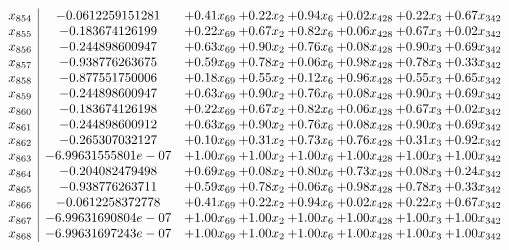 \documentclass[8pt]{article}
\begin{document}
\[\begin{array}{c| c c@{\hskip 2pt} c@{\hskip 2pt} c@{\hskip 2pt} c@{\hskip 2pt} c@{\hskip 2pt} c@{\hskip 2pt} }
 x_{854}   &  -0.0612259151281 & +  0.41 x_{69} & +  0.22 x_{2} & +  0.94 x_{6} & +  0.02 x_{428} & +  0.22 x_{3} & +  0.67 x_{342}\\
 x_{855}   &  -0.183674126199 & +  0.22 x_{69} & +  0.67 x_{2} & +  0.82 x_{6} & +  0.06 x_{428} & +  0.67 x_{3} & +  0.02 x_{342}\\
 x_{856}   &  -0.244898600947 & +  0.63 x_{69} & +  0.90 x_{2} & +  0.76 x_{6} & +  0.08 x_{428} & +  0.90 x_{3} & +  0.69 x_{342}\\
 x_{857}   &  -0.938776263675 & +  0.59 x_{69} & +  0.78 x_{2} & +  0.06 x_{6} & +  0.98 x_{428} & +  0.78 x_{3} & +  0.33 x_{342}\\
 x_{858}   &  -0.877551750006 & +  0.18 x_{69} & +  0.55 x_{2} & +  0.12 x_{6} & +  0.96 x_{428} & +  0.55 x_{3} & +  0.65 x_{342}\\
 x_{859}   &  -0.244898600947 & +  0.63 x_{69} & +  0.90 x_{2} & +  0.76 x_{6} & +  0.08 x_{428} & +  0.90 x_{3} & +  0.69 x_{342}\\
 x_{860}   &  -0.183674126198 & +  0.22 x_{69} & +  0.67 x_{2} & +  0.82 x_{6} & +  0.06 x_{428} & +  0.67 x_{3} & +  0.02 x_{342}\\
 x_{861}   &  -0.244898600912 & +  0.63 x_{69} & +  0.90 x_{2} & +  0.76 x_{6} & +  0.08 x_{428} & +  0.90 x_{3} & +  0.69 x_{342}\\
 x_{862}   &  -0.265307032127 & +  0.10 x_{69} & +  0.31 x_{2} & +  0.73 x_{6} & +  0.76 x_{428} & +  0.31 x_{3} & +  0.92 x_{342}\\
 x_{863}   &  -6.99631555801e-07 & +  1.00 x_{69} & +  1.00 x_{2} & +  1.00 x_{6} & +  1.00 x_{428} & +  1.00 x_{3} & +  1.00 x_{342}\\
 x_{864}   &  -0.204082479498 & +  0.69 x_{69} & +  0.08 x_{2} & +  0.80 x_{6} & +  0.73 x_{428} & +  0.08 x_{3} & +  0.24 x_{342}\\
 x_{865}   &  -0.938776263711 & +  0.59 x_{69} & +  0.78 x_{2} & +  0.06 x_{6} & +  0.98 x_{428} & +  0.78 x_{3} & +  0.33 x_{342}\\
 x_{866}   &  -0.0612258372778 & +  0.41 x_{69} & +  0.22 x_{2} & +  0.94 x_{6} & +  0.02 x_{428} & +  0.22 x_{3} & +  0.67 x_{342}\\
 x_{867}   &  -6.99631690804e-07 & +  1.00 x_{69} & +  1.00 x_{2} & +  1.00 x_{6} & +  1.00 x_{428} & +  1.00 x_{3} & +  1.00 x_{342}\\
 x_{868}   &  -6.99631697243e-07 & +  1.00 x_{69} & +  1.00 x_{2} & +  1.00 x_{6} & +  1.00 x_{428} & +  1.00 x_{3} & +  1.00 x_{342}\\

\end{array}\]
\end{document}
